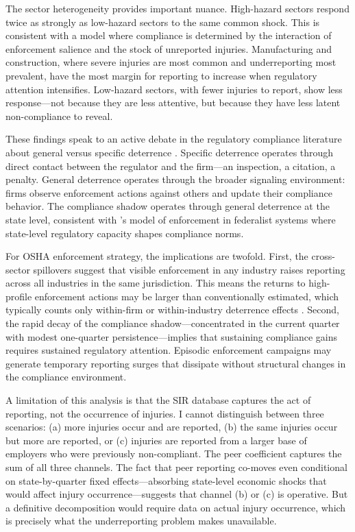 \documentclass[12pt]{article}
\begin{document}
The sector heterogeneity provides important nuance. High-hazard sectors respond twice as strongly as low-hazard sectors to the same common shock. This is consistent with a model where compliance is determined by the interaction of enforcement salience and the stock of unreported injuries. Manufacturing and construction, where severe injuries are most common and underreporting most prevalent, have the most margin for reporting to increase when regulatory attention intensifies. Low-hazard sectors, with fewer injuries to report, show less response---not because they are less attentive, but because they have less latent non-compliance to reveal.

These findings speak to an active debate in the regulatory compliance literature about general versus specific deterrence \citep{gray2005declining, thornton2005general}. Specific deterrence operates through direct contact between the regulator and the firm---an inspection, a citation, a penalty. General deterrence operates through the broader signaling environment: firms observe enforcement actions against others and update their compliance behavior. The compliance shadow operates through general deterrence at the state level, consistent with \citet{scholz1997compliance}'s model of enforcement in federalist systems where state-level regulatory capacity shapes compliance norms.

For OSHA enforcement strategy, the implications are twofold. First, the cross-sector spillovers suggest that visible enforcement in any industry raises reporting across all industries in the same jurisdiction. This means the returns to high-profile enforcement actions may be larger than conventionally estimated, which typically counts only within-firm or within-industry deterrence effects \citep{johnson2020osha}. Second, the rapid decay of the compliance shadow---concentrated in the current quarter with modest one-quarter persistence---implies that sustaining compliance gains requires sustained regulatory attention. Episodic enforcement campaigns may generate temporary reporting surges that dissipate without structural changes in the compliance environment.

A limitation of this analysis is that the SIR database captures the act of reporting, not the occurrence of injuries. I cannot distinguish between three scenarios: (a) more injuries occur and are reported, (b) the same injuries occur but more are reported, or (c) injuries are reported from a larger base of employers who were previously non-compliant. The peer coefficient captures the sum of all three channels. The fact that peer reporting co-moves even conditional on state-by-quarter fixed effects---absorbing state-level economic shocks that would affect injury occurrence---suggests that channel (b) or (c) is operative. But a definitive decomposition would require data on actual injury occurrence, which is precisely what the underreporting problem makes unavailable.
\end{document}
